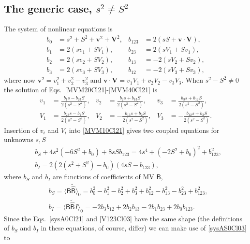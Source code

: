 \documentclass{birkjour}
\newcommand{\cliffordconjugate}[1]{\widetilde{\wideparen{#1}}}
\def\B{\mathsf{B}}
\newcommand{\bv}{\ensuremath{\mathbf{v}}}
\newcommand{\bV}{\ensuremath{\mathbf{V}}}
\begin{document}
\subsection{The generic case, $s^2 \neq S^2$}
The system of nonlinear equations is
\begin{align}
b_0&=s^2+S^2+\bv^2+\bV^2, &b_{123}&=2(sS+\bv\cdot\bV)\label{MVM10Cl21}, \\
b_1&=2(s v_1+S V_1), &b_{23}&=2(s V_1+S v_1)\label{MVM20Cl21}, \\
b_2&=2(s v_2+S V_2), &b_{13}&=-2(s V_2+S v_2)\label{MVM30Cl21}, \\
b_3&=2(s v_3+S V_3), &b_{12}&=-2(s V_3+S v_3)\label{MVM40Cl21},
\end{align}
where now $\bv^2=v_1^2+v_2^2-v_3^2$ and $\bv\cdot\bV=v_1 V_1 + v_2 V_2- v_3 V_3$. When $s^2-S^2\neq
0$ the solution of Eqs.~\eqref{MVM20Cl21}-\eqref{MVM40Cl21} is
\begin{align}
v_1&=\frac{b_1s-b_{23}S}{2(s^2-S^2)}, & v_2&=\frac{b_{2}s+ b_{13}S}{2(s^2-S^2)},&  v_3&=\frac{b_3s+b_{12}S}{2(s^2-S^2)},\label{v123Cl21}\\
V_1&=\frac{b_{23}s-b_{1}S}{2(s^2-S^2)},
&V_2&=-\frac{b_{13}s+b_{2}S}{2(s^2-S^2)},
&V_3&=-\frac{b_{12}s+b_{3}S}{2(s^2-S^2)}.\label{V123Cl21}
\end{align}
Insertion  of $v_i$ and $V_i$ into \eqref{MVM10Cl21} gives two
coupled equations for unknowns $s, S$
\begin{equation}\label{sysA0Cl21}
\begin{split}
& b_{S}+4 s^2 (-6 S^2+b_0)+8 s S b_{123}=4 s^4+(-2 S^2+b_0)^2+b_{123}^2,\\
  & b_{I}=2 (2 (s^2+S^2)-b_0) (4 s S-b_{123}),
\end{split}\end{equation}
  where $b_{S}$ and $b_{I}$ are functions of coefficients of MV $\B$,
\begin{equation}\label{bSbICl03A}
\begin{split}
&b_{S}= \langle \B \cliffordconjugate{\B}\rangle_0 =
b_{0}^2-b_{1}^2-b_{2}^2+b_{3}^2+ b_{12}^2-b_{13}^2-b_{23}^2+b_{123}^2,\\
&b_{I}= \langle \B
\cliffordconjugate{\B} I \rangle_0 = -2 b_{3} b_{12}+2 b_{2} b_{13}-2 b_{1} b_{23}+2 b_{0} b_{123}.
\end{split}
\end{equation}
Since the Eqs.~\eqref{sysA0Cl21} and \eqref{V123Cl03} have
  the same shape (the definitions of $b_{S}$ and $b_{I}$ in these
  equations, of course, differ) we can make use of \eqref{sysAS0Cl03} to
\end{document}
